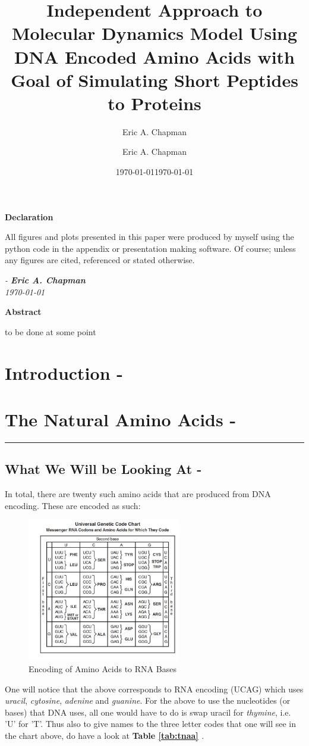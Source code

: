 \documentclass[a4paper,10pt]{article}
\author{Eric A. Chapman}
\date{\today}
\title{\textbf{Independent Approach to Molecular Dynamics Model Using DNA Encoded Amino Acids with Goal of Simulating Short Peptides to Proteins}}
\author{Eric A. Chapman}
\date{\today}
\begin{document}
\maketitle
\begin{center}
	\textbf{Declaration}
\end{center}
All figures and plots presented in this paper were produced by myself using the python code in the appendix or presentation making software. Of course; unless any figures are cited, referenced or stated otherwise.
\begin{flushright}
	\footnotesize
	\textit{
	- \textbf{Eric A. Chapman}\\
	\today}
\end{flushright}
\begin{center}
	\textbf{Abstract}
\end{center}
to be done at some point
\newpage
\tableofcontents
\listoffigures
\listoftables
\newpage
\section{Introduction -}

\section{The Natural Amino Acids -}
\rule{\textwidth}{1pt}
\subsection{What We Will be Looking At -}
In total, there are twenty such amino acids that are produced from DNA encoding. These are encoded as such:
\begin{figure}[H]
\centering
\includegraphics[width=0.6\textwidth]{images/rna_ecode.png}
\caption{Encoding of Amino Acids to RNA Bases}
\label{fig:rna_chart}
\end{figure}
One will notice that the above corresponds to RNA encoding (UCAG) which uses \textit{uracil}, \textit{cytosine}, \textit{adenine} and \textit{guanine}. For the above to use the nucleotides (or bases) that DNA uses, all one would have to do is swap uracil for \textit{thymine}, i.e. 'U' for 'T'. Thus also to give names to the three letter codes that one will see in the chart above, do have a look at \textbf{Table \ref{tab:tnaa} \cite{chart}}. 
\end{document}
